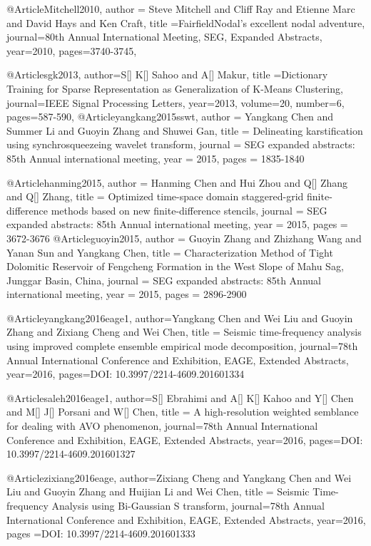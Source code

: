 @Article{Mitchell2010,
  author = {Steve Mitchell and Cliff Ray and Etienne Marc and David Hays and Ken Craft},
  title ={FairfieldNodal's excellent nodal adventure},
  journal={80th Annual International Meeting, SEG, Expanded Abstracts},
  year=2010,
  pages={3740-3745},
}

@Article{sgk2013,
  author={S[] K[] Sahoo and A[] Makur},
  title ={Dictionary Training	for	Sparse Representation as Generalization	of K-Means Clustering},
  journal={IEEE Signal Processing Letters},
  year=2013,
  volume=20,
  number=6,
  pages={587-590},
}
@Article{yangkang2015sswt,
  author = 	 {Yangkang Chen and Summer Li and Guoyin Zhang and Shuwei Gan},
  title = 	 {Delineating karstification using synchrosqueezeing wavelet transform},
  journal = 	 {SEG expanded abstracts: 85th Annual international meeting},
  year = 	 2015,
  pages =	 {1835-1840}
}

@Article{hanming2015,
  author = 	 {Hanming Chen and Hui Zhou and Q[] Zhang and Q[] Zhang},
  title = 	 {Optimized time-space domain staggered-grid finite-difference methods based on new finite-difference stencils},
  journal = 	 {SEG expanded abstracts: 85th Annual international meeting},
  year = 	 2015,
  pages =	 {3672-3676}
}
@Article{guoyin2015,
  author = 	 {Guoyin Zhang and Zhizhang Wang and Yanan Sun and Yangkang Chen},
  title = 	 {Characterization Method of Tight Dolomitic Reservoir of Fengcheng Formation in the West Slope of Mahu Sag, Junggar Basin, China},
  journal = 	 {SEG expanded abstracts: 85th Annual international meeting},
  year = 	 2015,
  pages =	 {2896-2900}
}

@Article{yangkang2016eage1,
  author={Yangkang Chen and Wei Liu and Guoyin Zhang and Zixiang Cheng and Wei Chen},
  title = {Seismic time-frequency analysis using improved complete ensemble empirical mode decomposition},
  journal={78th Annual International Conference and Exhibition, EAGE, Extended Abstracts},
  year=2016,
  pages={DOI: 10.3997/2214-4609.201601334}
  }


@Article{saleh2016eage1,
  author={S[] Ebrahimi and A[] K[] Kahoo and Y[] Chen and M[] J[] Porsani and W[] Chen},
  title = {A high-resolution weighted semblance for dealing with AVO phenomenon},
  journal={78th Annual International Conference and Exhibition, EAGE, Extended Abstracts},
  year=2016,
  pages={DOI: 10.3997/2214-4609.201601327}
  }  
  
  
@Article{zixiang2016eage,
  author={Zixiang Cheng and Yangkang Chen and Wei Liu and Guoyin Zhang and Huijian Li and Wei Chen},
  title = {Seismic Time-frequency Analysis using Bi-Gaussian S transform},
  journal={78th Annual International Conference and Exhibition, EAGE, Extended Abstracts},
  year=2016,
  pages ={DOI: 10.3997/2214-4609.201601333}
  }

